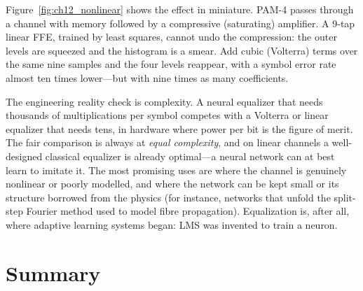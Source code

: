 Figure~\ref{fig:ch12_nonlinear} shows the effect in miniature. PAM-4 passes through a channel with
memory followed by a compressive (saturating) amplifier. A 9-tap linear FFE, trained by least squares,
cannot undo the compression: the outer levels are squeezed and the histogram is a smear. Add cubic
(Volterra) terms over the same nine samples and the four levels reappear, with a symbol error rate
almost ten times lower---but with nine times as many coefficients.


The engineering reality check is complexity. A neural equalizer that needs thousands of
multiplications per symbol competes with a Volterra or linear equalizer that needs tens, in hardware
where power per bit is the figure of merit. The fair comparison is always at \emph{equal complexity},
and on linear channels a well-designed classical equalizer is already optimal---a neural network can at
best learn to imitate it. The most promising uses are where the channel is genuinely nonlinear or poorly
modelled, and where the network can be kept small or its structure borrowed from the physics (for
instance, networks that unfold the split-step Fourier method used to model fibre propagation).
Equalization is, after all, where adaptive learning systems began: LMS was invented to train a neuron.

\section{Summary}
\label{sec:ch12:summary}

